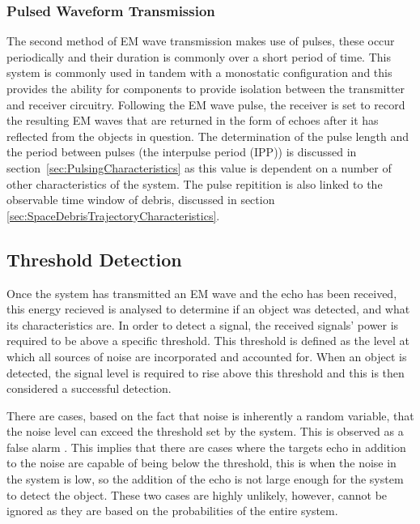 \documentclass[11pt]{witseiepaper}
\begin{document}
\subsubsection{Pulsed Waveform Transmission} \label{sec:PulsedWaveformTransmission}

The second method of EM wave transmission makes use of pulses, these occur periodically and their duration is commonly over a short period of time. This system is commonly used in tandem with a monostatic configuration and this provides the ability for components to provide isolation between the transmitter and receiver circuitry.
Following the EM wave pulse, the receiver is set to record the resulting EM waves that are returned in the form of echoes after it has reflected from the objects in question. The determination of the pulse length and the period between pulses (the interpulse period (IPP)) is discussed in section~\ref{sec:PulsingCharacteristics} as this value is dependent on a number of other characteristics of the system. The pulse repitition is also linked to the observable time window of debris, discussed in section \ref{sec:SpaceDebrisTrajectoryCharacteristics}.


\subsection{Threshold Detection} \label{sec:ThresholdDetection}
Once the system has transmitted an EM wave and the echo has been received, this energy recieved is analysed to determine if an object was detected, and what its characteristics are.
In order to detect a signal, the received signals' power is required to be above a specific threshold. This threshold is defined as the level at which all sources of noise are incorporated and accounted for. When an object is detected, the signal level is required to rise above this threshold and this is then considered a successful detection.

There are cases, based on the fact that noise is inherently a random variable, that the noise level can exceed the threshold set by the system. This is observed as a false alarm \cite[Ch~.3]{radarHandbook}.
This implies that there are cases where the targets echo in addition to the noise are capable of being below the threshold, this is when the noise in the system is low, so the addition of the echo is not large enough for the system to detect the object.
These two cases are highly unlikely, however, cannot be ignored as they are based on the probabilities of the entire system.
\end{document}
